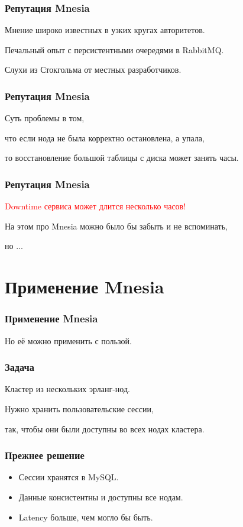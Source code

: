 \documentclass[10pt]{beamer}
\begin{document}
\begin{frame}
\frametitle{Репутация Mnesia}
\centering
Мнение широко известных в узких кругах авторитетов.
\par
\bigskip
Печальный опыт с персистентными очередями в RabbitMQ.
\par
\bigskip
Слухи из Стокгольма от местных разработчиков.
\end{frame}

\begin{frame}
\frametitle{Репутация Mnesia}
\centering
Суть проблемы в том,
\par \bigskip
что если нода не была корректно остановлена, а упала,
\par \bigskip
то восстановление большой таблицы с диска может занять часы.
\end{frame}

\begin{frame}
\frametitle{Репутация Mnesia}
\centering
\textcolor{red}{Downtime сервиса может длится несколько часов!}
\par \bigskip
На этом про Mnesia можно было бы забыть и не вспоминать,
\par \bigskip
но ...
\end{frame}

\section{Применение Mnesia}

\begin{frame}
\frametitle{Применение Mnesia}
\centering
Но её можно применить с пользой.
\end{frame}

\begin{frame}
\frametitle{Задача}
\centering
Кластер из нескольких эрланг-нод.
\par \bigskip
Нужно хранить пользовательские сессии,
\par \bigskip
так, чтобы они были доступны во всех нодах кластера.
\end{frame}

\begin{frame}
\frametitle{Прежнее решение}
\begin{itemize}[<+->]
\item Сессии хранятся в MySQL.
\item Данные консистентны и доступны все нодам.
\item Latency больше, чем могло бы быть.
\end{itemize}
\end{frame}
\end{document}
